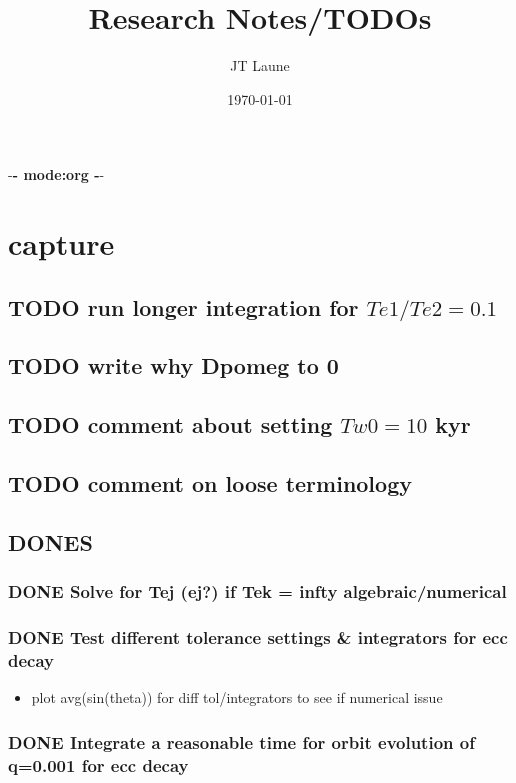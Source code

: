 \documentclass[11pt]{article}
\author{JT Laune}
\date{\today}
\title{Research Notes/TODOs}
\begin{document}
\maketitle
\tableofcontents

-\textbf{- mode:org -}-
\section{capture}
\label{sec:org67e5718}
\subsection{{\bfseries\sffamily TODO} run longer integration for \(Te1/Te2=0.1\)}
\label{sec:orga8e608c}
\subsection{{\bfseries\sffamily TODO} write why Dpomeg to 0}
\label{sec:org6c8875b}
\subsection{{\bfseries\sffamily TODO} comment about setting \(Tw0=10\) kyr}
\label{sec:orgd10b7d2}
\subsection{{\bfseries\sffamily TODO} comment on loose terminology}
\label{sec:org4b70122}
\subsection{DONES}
\label{sec:org180a494}
\subsubsection{{\bfseries\sffamily DONE} Solve for Tej (ej?) if Tek = infty algebraic/numerical}
\label{sec:org52615aa}
\subsubsection{{\bfseries\sffamily DONE} Test different tolerance settings \& integrators for ecc decay}
\label{sec:org8fb3be1}
\begin{itemize}
\item plot avg(sin(theta)) for diff tol/integrators to see if numerical issue
\end{itemize}
\subsubsection{{\bfseries\sffamily DONE} Integrate a reasonable time for orbit evolution of q=0.001 for ecc decay}
\label{sec:org3f5a3ad}
\end{document}

